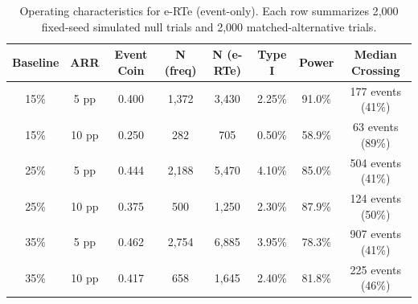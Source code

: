 \begin{table}[htbp]
\centering
\caption{Operating characteristics for e-RTe (event-only). Each row summarizes 2{,}000 fixed-seed simulated null trials and 2{,}000 matched-alternative trials.}
\begin{tabular}{@{}cccccccc@{}}
\toprule
Baseline & ARR & Event Coin & N (freq) & N (e-RTe) & Type I & Power & Median Crossing \\
\midrule
15\% & 5 pp & 0.400 & 1{,}372 & 3{,}430 & 2.25\% & 91.0\% & 177 events (41\%) \\
15\% & 10 pp & 0.250 & 282 & 705 & 0.50\% & 58.9\% & 63 events (89\%) \\
25\% & 5 pp & 0.444 & 2{,}188 & 5{,}470 & 4.10\% & 85.0\% & 504 events (41\%) \\
25\% & 10 pp & 0.375 & 500 & 1{,}250 & 2.30\% & 87.9\% & 124 events (50\%) \\
35\% & 5 pp & 0.462 & 2{,}754 & 6{,}885 & 3.95\% & 78.3\% & 907 events (41\%) \\
35\% & 10 pp & 0.417 & 658 & 1{,}645 & 2.40\% & 81.8\% & 225 events (46\%) \\
\bottomrule
\end{tabular}
\label{tab:erte_simulations}
\end{table}
